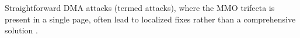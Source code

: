 

Straightforward DMA attacks (termed \simple attacks), where the MMO trifecta is present in a single page, often lead to localized fixes rather than a comprehensive solution \cite{thunder}.

